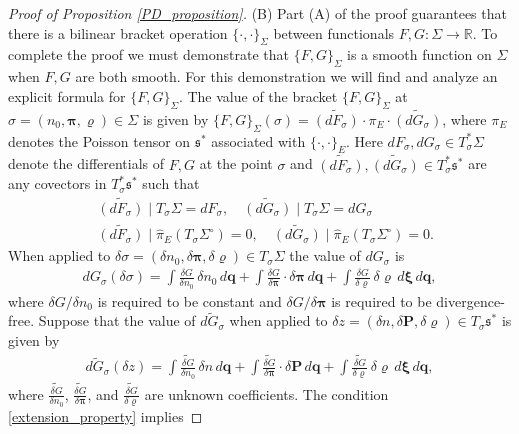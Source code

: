 \documentclass[10pt,a4paper]{amsart}
\begin{document}
\begin{proof}[Proof of Proposition \ref{PD_proposition}]
(B) Part (A) of the proof guarantees that there is a bilinear bracket operation $\{\cdot,\cdot\}_\Sigma$ between functionals $F,G:\Sigma\rightarrow\mathbb{R}$. To complete the proof we must demonstrate that $\{F,G\}_\Sigma$ is a smooth function on $\Sigma$ when $F,G$ are both smooth. For this demonstration we will find and analyze an explicit formula for $\{F,G\}_\Sigma$. The value of the bracket $\{F,G\}_\Sigma$ at $\sigma=(n_0,\bm{\pi},\varrho)\in \Sigma$ is given by $\{F,G\}_\Sigma(\sigma) = \widetilde{(dF_\sigma)}\cdot \pi_{E}\cdot \widetilde{(dG_\sigma)}$, where $\pi_E$ denotes the Poisson tensor on $\mathfrak{s}^*$ associated with $\{\cdot,\cdot\}_E$. Here $dF_\sigma,dG_\sigma\in T^*_\sigma\Sigma$ denote the differentials of $F,G$ at the point $\sigma$ and $\widetilde{(dF_\sigma)},\widetilde{(dG_\sigma)}\in T^*_\sigma\mathfrak{s}^*$ are any covectors in $T^*_\sigma\mathfrak{s}^*$ such that
\begin{align}
&\widetilde{(dF_\sigma)}\mid T_\sigma\Sigma = dF_\sigma,\quad \widetilde{(dG_\sigma)}\mid T_\sigma\Sigma = dG_\sigma\label{extension_property}\\
&\widetilde{(dF_\sigma)}\mid \widehat{\pi}_E(T_\sigma\Sigma^\circ) = 0,\quad \widetilde{(dG_\sigma)}\mid \widehat{\pi}_E(T_\sigma\Sigma^\circ) = 0.\label{transverse_property}
\end{align}
When applied to $\delta \sigma = (\delta n_0,\delta\bm{\pi},\delta\varrho)\in T_\sigma\Sigma$ the value of $dG_\sigma$ is
\begin{align*}
dG_\sigma(\delta \sigma) = \int \frac{\delta G}{\delta n_0}\,\delta n_0\,d\bm{q} + \int \frac{\delta G}{\delta \bm{\pi}}\cdot\delta\bm{\pi}\,d\bm{q} + \int\frac{\delta G}{\delta\varrho}\,\delta\varrho\,d\bm{\xi}\,d\bm{q},
\end{align*}
where $\delta G/\delta n_0$ is required to be constant and $\delta G/\delta\bm{\pi}$ is required to be divergence-free.
Suppose that the value of $\widetilde{dG_\sigma}$ when applied to $\delta z = (\delta n,\delta \bm{P},\delta\varrho)\in T_\sigma\mathfrak{s}^*$ is given by
\begin{align*}
\widetilde{dG_\sigma}(\delta z) = \int \widetilde{\frac{\delta G}{\delta n_0}}\,\delta n\,d\bm{q} + \int \widetilde{\frac{\delta G}{\delta\bm{\pi}}}\cdot \delta\bm{P}\,d\bm{q} + \int \widetilde{\frac{\delta G}{\delta\varrho}}\,\delta\varrho\,d\bm{\xi}\,d\bm{q},
\end{align*}
where $\widetilde{\frac{\delta G}{\delta n_0}}$, $\widetilde{\frac{\delta G}{\delta\bm{\pi}}}$, and $\widetilde{\frac{\delta G}{\delta\varrho}}$ are unknown coefficients. The condition \eqref{extension_property} implies

\end{proof}
\end{document}
